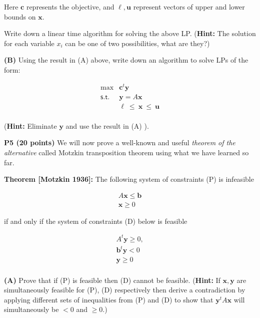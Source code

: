 \documentclass[11pt]{article}
\newcommand\vx {\mathbf{x}}
\newcommand\vy {\mathbf{y}}
\begin{document}
Here $\mathbf{c}$ represents the objective, and $\ell, \mathbf{u}$
represent vectors of upper and lower bounds on $\mathbf{x}$. 

Write down a linear time algorithm for solving the above LP.
(\textbf{Hint:} The solution for each variable $x_i$ can be one of two
possibilities, what are they?)

\medskip

\noindent\textbf{(B)} Using the result in (A) above, write down an
algorithm to solve LPs of the form:

\[ \begin{array}{rl}
\max & \mathbf{c}^t \mathbf{y} \\
\mathsf{s.t.} & \mathbf{y} = A \mathbf{x} \\
& \mathbf{\ell}\ \leq\ \mathbf{x}\ \leq\ \mathbf{u} \\
\end{array}\]

(\textbf{Hint:} Eliminate $\mathbf{y}$ and use the result in (A) ).

\noindent\textbf{P5 (20 points)} We will now prove a well-known
and useful \emph{theorem of the alternative} called Motzkin
transposition theorem using what we have learned so far.

\begin{framed}
\noindent\textbf{Theorem [Motzkin 1936]:} The following system of constraints \textsf{(P)} is infeasible

\[ \begin{array}{l}
A \mathbf{x} \leq \mathbf{b}\\
 \mathbf{x} \geq 0 
\end{array}\]

 if and only if the system of constraints \textsf{(D)}  below is feasible

\[ \begin{array}{l}
A^t \mathbf{y} \geq 0,\\
\mathbf{b}^t \mathbf{y} < 0\\
\mathbf{y} \geq 0 \\
\end{array}\]
\end{framed}

\noindent\textbf{(A)} Prove that if \textsf{(P)} is feasible then
\textsf{(D)} cannot be feasible. (\textbf{Hint:} If $\vx, \vy$ are
simultaneously feasible for \textsf{(P)}, \textsf{(D)} respectively
then derive a contradiction by applying different sets of inequalities
from \textsf{(P)} and \textsf{(D)} to show that $\mathbf{y}^t A \mathbf{x}$ will simultaneously be
$< 0$ and $ \geq 0$.) 
\end{document}
